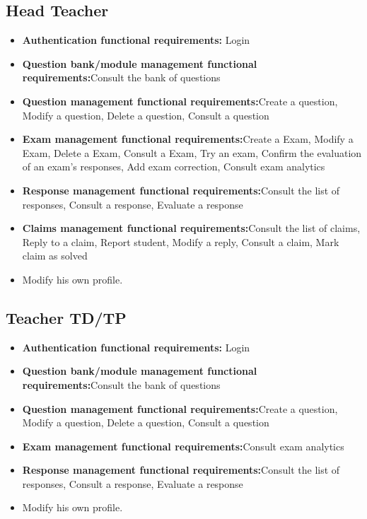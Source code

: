 \documentclass[]{uc2pfecaneva}
\begin{document}
    \subsection{Head Teacher}
    \begin{itemize}
        \item{\textbf{Authentication functional requirements:} Login}
        \item{\textbf{Question bank/module management functional requirements:}Consult the bank of questions}
        \item{\textbf{Question management functional requirements:}Create a question, Modify a question, Delete a question, Consult a question}
        \item{\textbf{Exam management functional requirements:}Create a Exam, Modify a Exam, Delete a Exam, Consult a Exam, Try an exam, Confirm the evaluation of an exam's responses, Add exam correction, Consult exam analytics}
        \item{\textbf{Response management functional requirements:}Consult the list of responses, Consult a response, Evaluate a response}
        \item{\textbf{Claims management functional requirements:}Consult the list of claims, Reply to a claim, Report student, Modify a reply, Consult a claim, Mark claim as solved}
        \item Modify his own profile.
    \end{itemize}


    \subsection{Teacher TD/TP}
    \begin{itemize}
        \item{\textbf{Authentication functional requirements:} Login}
        \item{\textbf{Question bank/module management functional requirements:}Consult the bank of questions}
        \item{\textbf{Question management functional requirements:}Create a question, Modify a question, Delete a question, Consult a question}
        \item{\textbf{Exam management functional requirements:}Consult exam analytics}
        \item{\textbf{Response management functional requirements:}Consult the list of responses, Consult a response, Evaluate a response}
        \item Modify his own profile.
    \end{itemize}
\end{document}

